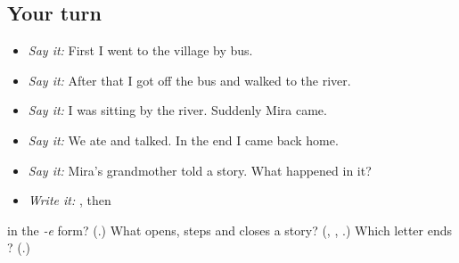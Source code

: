 \subsection*{Your turn}
\begin{itemize}
\raggedright
  \item \emph{Say it:} First I went to the village by bus.
  \item \emph{Say it:} After that I got off the bus and walked to the river.
  \item \emph{Say it:} I was sitting by the river. Suddenly Mira came.
  \item \emph{Say it:} We ate and talked. In the end I came back home.
  \item \emph{Say it:} Mira's grandmother told a story. What happened in it?
  \item \emph{Write it:} \textbf{}, then \textbf{}
\end{itemize}

\begin{tcolorbox}[breakable,colback=teal!4,colframe=teal!35!black,title={Before you move on}]
\textbf{} in the \emph{-e} form? (\textbf{}.) What opens, steps and closes a story? (\textbf{}, \textbf{}, \textbf{}.) Which letter ends \textbf{}? (\textbf{}.)
\end{tcolorbox}
